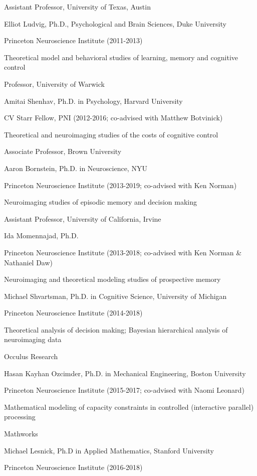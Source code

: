 \documentclass[10 pt]{article}
\begin{document}
Assistant Professor, University of Texas, Austin
    \medskip

Elliot Ludvig, Ph.D., Psychological and Brain Sciences, Duke University

Princeton Neuroscience Institute (2011-2013)

Theoretical model and behavioral studies of learning, memory and cognitive control

Professor, University of Warwick
    \medskip

Amitai Shenhav, Ph.D. in Psychology, Harvard University

CV Starr Fellow, PNI (2012-2016; co-advised with Matthew Botvinick)

Theoretical and neuroimaging studies of the costs of cognitive control

Associate Professor, Brown University
    \medskip

Aaron Bornstein, Ph.D. in Neuroscience, NYU

Princeton Neuroscience Institute (2013-2019; co-advised with Ken Norman)

Neuroimaging studies of episodic memory and decision making

Assistant Professor, University of California, Irvine
    \medskip

Ida Momennajad, Ph.D.

Princeton Neuroscience Institute (2013-2018; co-advised with Ken Norman \& Nathaniel Daw)

Neuroimaging and theoretical modeling studies of prospective memory
    \medskip

Michael Shvartsman, Ph.D. in Cognitive Science, University of Michigan

Princeton Neuroscience Institute (2014-2018)

Theoretical analysis of decision making; Bayesian hierarchical analysis of neuroimaging data

Occulus Research
    \medskip

Hasan Kayhan Ozcimder, Ph.D. in Mechanical Engineering, Boston University

Princeton Neuroscience Institute (2015-2017; co-advised with Naomi Leonard)

Mathematical modeling of capacity constraints in controlled (interactive parallel) processing

Mathworks
    \medskip

Michael Lesnick, Ph.D in Applied Mathematics, Stanford University

Princeton Neuroscience Institute (2016-2018)
\end{document}
